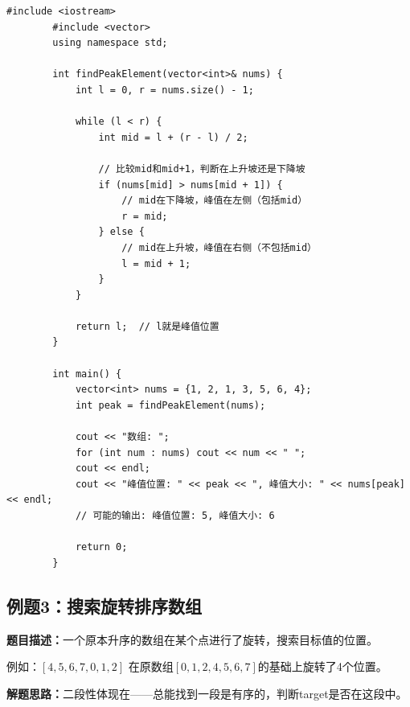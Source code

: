 \documentclass[12pt,a4paper]{article}
\begin{document}
	\begin{lstlisting}[caption={例题2：寻找峰值}]
		#include <iostream>
		#include <vector>
		using namespace std;
		
		int findPeakElement(vector<int>& nums) {
			int l = 0, r = nums.size() - 1;
			
			while (l < r) {
				int mid = l + (r - l) / 2;
				
				// 比较mid和mid+1，判断在上升坡还是下降坡
				if (nums[mid] > nums[mid + 1]) {
					// mid在下降坡，峰值在左侧（包括mid）
					r = mid;
				} else {
					// mid在上升坡，峰值在右侧（不包括mid）
					l = mid + 1;
				}
			}
			
			return l;  // l就是峰值位置
		}
		
		int main() {
			vector<int> nums = {1, 2, 1, 3, 5, 6, 4};
			int peak = findPeakElement(nums);
			
			cout << "数组: ";
			for (int num : nums) cout << num << " ";
			cout << endl;
			cout << "峰值位置: " << peak << ", 峰值大小: " << nums[peak] << endl;
			// 可能的输出: 峰值位置: 5, 峰值大小: 6
			
			return 0;
		}
	\end{lstlisting}
	
	\subsection{例题3：搜索旋转排序数组}
	
	\textbf{题目描述：}一个原本升序的数组在某个点进行了旋转，搜索目标值的位置。
	
	例如：$[4,5,6,7,0,1,2]$ 在原数组$[0,1,2,4,5,6,7]$的基础上旋转了4个位置。
	
	\textbf{解题思路：}二段性体现在——总能找到一段是有序的，判断target是否在这段中。
	
\end{document}
